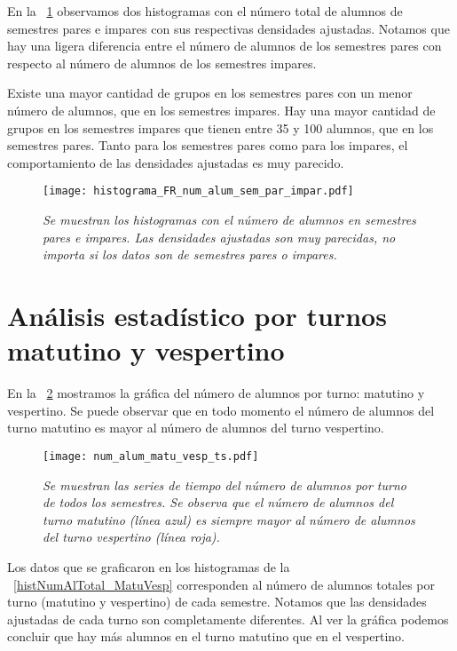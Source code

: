 En la \figurename{~\ref{histNumAlTotal_ParImpar}} observamos dos histogramas con el número total de alumnos de semestres pares e impares con sus respectivas densidades ajustadas. Notamos que hay una ligera diferencia entre el número de alumnos de los semestres pares con respecto al número de alumnos de los semestres impares.

Existe una mayor cantidad de grupos en los semestres pares con un menor número de alumnos, que en los semestres impares. Hay una mayor cantidad de grupos en los semestres impares que tienen entre 35 y 100 alumnos, que en los semestres pares. Tanto para los semestres pares como para los impares, el comportamiento de las densidades ajustadas es muy parecido.


\begin{figure}[H]
\centering
\texttt{[image: histograma\_FR\_num\_alum\_sem\_par\_impar.pdf]} %
\caption[\textit{Histogramas del número de alumnos en semestres pares e impares}]{\textit{Se muestran los histogramas con el número de alumnos en semestres pares e impares. Las densidades ajustadas son muy parecidas, no importa si los datos son de semestres pares o impares.}}\label{histNumAlTotal_ParImpar}
\end{figure}

\section{Análisis estadístico por turnos matutino y vespertino} \label{Sec_AE_x_turno}

En la \figurename{~\ref{NumAlTotal_MatuVesp_ts}} mostramos la gráfica del número de alumnos por turno: matutino y vespertino. Se puede observar que en todo momento el número de alumnos del turno matutino es mayor al número de alumnos del turno vespertino.

\begin{figure}[h]
\centering
\texttt{[image: num\_alum\_matu\_vesp\_ts.pdf]} %
\caption[\textit{Número de alumnos por turno de todos los semestres}]{\textit{Se muestran las series de tiempo del número de alumnos por turno de todos los semestres. Se observa que el número de alumnos del turno matutino (línea azul) es siempre mayor al número de alumnos del turno vespertino (línea roja).}}\label{NumAlTotal_MatuVesp_ts}
\end{figure}

Los datos que se graficaron en los histogramas de la \figurename{~\ref{histNumAlTotal_MatuVesp}} corresponden al número de alumnos totales por turno (matutino y vespertino) de cada semestre. Notamos que las densidades ajustadas de cada turno son completamente diferentes. Al ver la gráfica podemos concluir que hay más alumnos en el turno matutino que en el vespertino.


